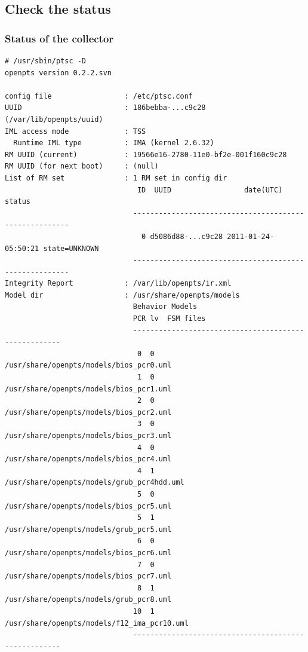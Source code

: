 \subsection{Check the status}

\subsubsection{Status of the collector}

\begin{lstlisting}[style=console]
# /usr/sbin/ptsc -D
openpts version 0.2.2.svn

config file                 : /etc/ptsc.conf
UUID                        : 186bebba-...c9c28 (/var/lib/openpts/uuid)
IML access mode             : TSS
  Runtime IML type          : IMA (kernel 2.6.32)
RM UUID (current)           : 19566e16-2780-11e0-bf2e-001f160c9c28
RM UUID (for next boot)     : (null)
List of RM set              : 1 RM set in config dir
                               ID  UUID                 date(UTC)         status
                              -------------------------------------------------------
                                0 d5086d88-...c9c28 2011-01-24-05:50:21 state=UNKNOWN
                              -------------------------------------------------------
Integrity Report            : /var/lib/openpts/ir.xml
Model dir                   : /usr/share/openpts/models
                              Behavior Models
                              PCR lv  FSM files
                              -----------------------------------------------------
                               0  0  /usr/share/openpts/models/bios_pcr0.uml
                               1  0  /usr/share/openpts/models/bios_pcr1.uml
                               2  0  /usr/share/openpts/models/bios_pcr2.uml
                               3  0  /usr/share/openpts/models/bios_pcr3.uml
                               4  0  /usr/share/openpts/models/bios_pcr4.uml
                               4  1  /usr/share/openpts/models/grub_pcr4hdd.uml
                               5  0  /usr/share/openpts/models/bios_pcr5.uml
                               5  1  /usr/share/openpts/models/grub_pcr5.uml
                               6  0  /usr/share/openpts/models/bios_pcr6.uml
                               7  0  /usr/share/openpts/models/bios_pcr7.uml
                               8  1  /usr/share/openpts/models/grub_pcr8.uml
                              10  1  /usr/share/openpts/models/f12_ima_pcr10.uml
                              -----------------------------------------------------
\end{lstlisting}

